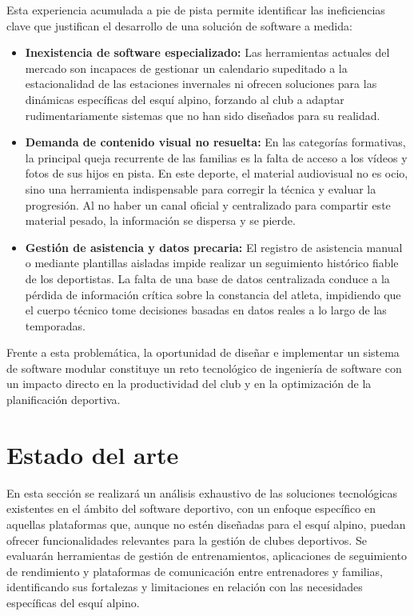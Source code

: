     Esta experiencia acumulada a pie de pista permite identificar las ineficiencias clave que justifican el desarrollo de una solución de software a medida:
    \begin{itemize}
        \item \textbf{Inexistencia de software especializado:} Las herramientas actuales del mercado son incapaces de gestionar un calendario supeditado a la estacionalidad de las estaciones invernales ni ofrecen soluciones para las dinámicas específicas del esquí alpino, forzando al club a adaptar rudimentariamente sistemas que no han sido diseñados para su realidad.
    
        \item \textbf{Demanda de contenido visual no resuelta:} En las categorías formativas, la principal queja recurrente de las familias es la falta de acceso a los vídeos y fotos de sus hijos en pista. En este deporte, el material audiovisual no es ocio, sino una herramienta indispensable para corregir la técnica y evaluar la progresión. Al no haber un canal oficial y centralizado para compartir este material pesado, la información se dispersa y se pierde.
    
        \item \textbf{Gestión de asistencia y datos precaria:} El registro de asistencia manual o mediante plantillas aisladas impide realizar un seguimiento histórico fiable de los deportistas. La falta de una base de datos centralizada conduce a la pérdida de información crítica sobre la constancia del atleta, impidiendo que el cuerpo técnico tome decisiones basadas en datos reales a lo largo de las temporadas.
    \end{itemize}

    Frente a esta problemática, la oportunidad de diseñar e implementar un sistema de software modular constituye un reto tecnológico de ingeniería de software con un impacto directo en la productividad del club y en la optimización de la planificación deportiva.

    \section{Estado del arte}
    En esta sección se realizará un análisis exhaustivo de las soluciones tecnológicas existentes en el ámbito del software deportivo, con un enfoque específico en aquellas plataformas que, aunque no estén diseñadas para el esquí alpino, puedan ofrecer funcionalidades relevantes para la gestión de clubes deportivos. Se evaluarán herramientas de gestión de entrenamientos, aplicaciones de seguimiento de rendimiento y plataformas de comunicación entre entrenadores y familias, identificando sus fortalezas y limitaciones en relación con las necesidades específicas del esquí alpino.
    
